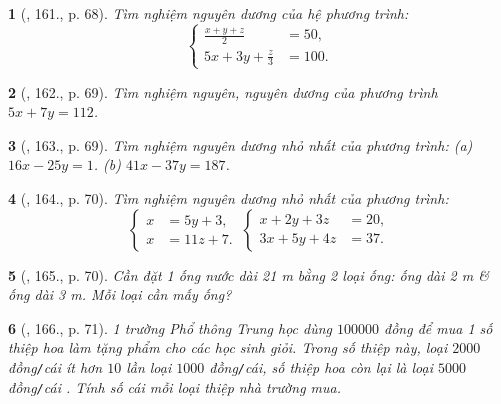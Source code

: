 \documentclass{article}
\newtheorem{baitoan}{}
\begin{document}
\begin{baitoan}[\cite{Dong_23_1001_toan_I}, 161., p. 68]
	Tìm nghiệm nguyên dương của hệ phương trình:
	\begin{equation*}
		\left\{\begin{split}
			\frac{x + y + z}{2} &= 50,\\
			5x + 3y + \frac{z}{3} &= 100.
		\end{split}\right.
	\end{equation*}
\end{baitoan}

\begin{baitoan}[\cite{Dong_23_1001_toan_I}, 162., p. 69]
	Tìm nghiệm nguyên, nguyên dương của phương trình $5x + 7y = 112$.
\end{baitoan}

\begin{baitoan}[\cite{Dong_23_1001_toan_I}, 163., p. 69]
	Tìm nghiệm nguyên dương nhỏ nhất của phương trình: (a) $16x - 25y = 1$. (b) $41x - 37y = 187$.
\end{baitoan}

\begin{baitoan}[\cite{Dong_23_1001_toan_I}, 164., p. 70]
	Tìm nghiệm nguyên dương nhỏ nhất của phương trình:
	\begin{equation*}
		\left\{\begin{split}
			x &= 5y + 3,\\
			x &= 11z + 7.
		\end{split}\right.\ \left\{\begin{split}
			x + 2y + 3z &= 20,\\
			3x + 5y + 4z &= 37.
		\end{split}\right.
	\end{equation*}
\end{baitoan}

\begin{baitoan}[\cite{Dong_23_1001_toan_I}, 165., p. 70]
	Cần đặt 1 ống nước dài {\rm21 m} bằng 2 loại ống: ống dài {\rm2 m} \& ống dài {\rm3 m}. Mỗi loại cần mấy ống?
\end{baitoan}

\begin{baitoan}[\cite{Dong_23_1001_toan_I}, 166., p. 71]
	1 trường Phổ thông Trung học dùng $100000$ đồng để mua 1 số thiệp hoa làm tặng phẩm cho các học sinh giỏi. Trong số thiệp này, loại $2000$ đồng{\tt/}cái ít hơn $10$ lần loại $1000$ đồng{\tt/}cái, số thiệp hoa còn lại là loại $5000$ đồng{\tt/}cái . Tính số cái mỗi loại thiệp nhà trường mua.
\end{baitoan}
\end{document}
